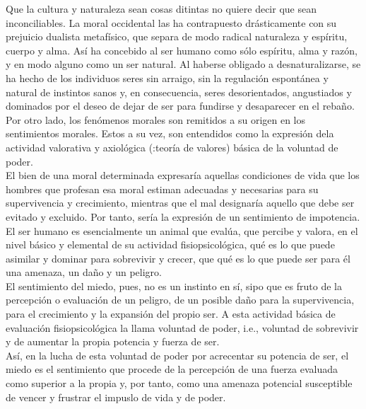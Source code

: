 \documentclass[a4paper, 10pt, twocolumn, spanish]{article}
\begin{document}
Que la cultura y naturaleza sean cosas ditintas no quiere decir que
sean inconciliables. La moral occidental las ha contrapuesto
drásticamente con su prejuicio dualista metafísico, que separa de modo
radical naturaleza y espíritu, cuerpo y alma. Así ha concebido al ser
humano como sólo espíritu, alma y razón, y en modo alguno como un ser
natural. Al haberse obligado a desnaturalizarse, se ha hecho de los
individuos seres sin arraigo, sin la regulación espontánea y natural
de instintos sanos y, en consecuencia, seres desorientados,
angustiados y dominados por el deseo de dejar de ser para fundirse y
desaparecer en el rebaño.\\[0pt]

Por otro lado, los fenómenos morales son remitidos a su origen en los
sentimientos morales. Estos a su vez, son entendidos como la expresión
dela actividad valorativa y axiológica (:teoría de valores) básica de
la voluntad de poder.\\[0pt]
El bien de una moral determinada expresaría aquellas condiciones de
vida que los hombres que profesan esa moral estiman adecuadas y
necesarias para su supervivencia y crecimiento, mientras que el mal
designaría aquello que debe ser evitado y excluido. Por tanto, sería
la expresión de un sentimiento de impotencia.\\[0pt]

El ser humano es esencialmente un animal que evalúa, que percibe y
valora, en el nivel básico y elemental de su actividad
fisiopsicológica, qué es lo que puede asimilar y dominar para
sobrevivir y crecer, que qué es lo que puede ser para él una amenaza,
un daño y un peligro.\\[0pt]

El sentimiento del miedo, pues, no es un instinto en sí, sipo que es
fruto de la percepción o evaluación de un peligro, de un posible daño
para la supervivencia, para el crecimiento y la expansión del propio
ser. A esta actividad básica de evaluación fisiopsicológica la llama
voluntad de poder, i.e., voluntad de sobrevivir y de aumentar la
propia potencia y fuerza de ser.\\[0pt]
Así, en la lucha de esta voluntad de poder por acrecentar su potencia
de ser, el miedo es el sentimiento que procede de la percepción de una
fuerza evaluada como superior a la propia y, por tanto, como una
amenaza potencial susceptible de vencer y frustrar el impuslo de vida
y de poder.\\[0pt]
\end{document}
